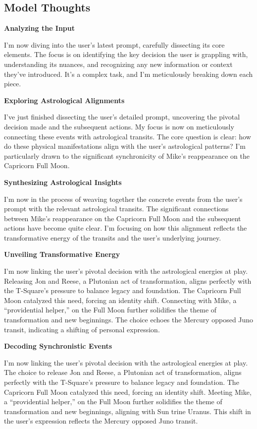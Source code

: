\documentclass{article}
\begin{document}
\medskip

\subsection*{Model Thoughts}\label{model-thoughts}

\textbf{Analyzing the Input}

I'm now diving into the user's latest prompt, carefully dissecting its
core elements. The focus is on identifying the key decision the user is
grappling with, understanding its nuances, and recognizing any new
information or context they've introduced. It's a complex task, and I'm
meticulously breaking down each piece.

\textbf{Exploring Astrological Alignments}

I've just finished dissecting the user's detailed prompt, uncovering the
pivotal decision made and the subsequent actions. My focus is now on
meticulously connecting these events with astrological transits. The
core question is clear: how do these physical manifestations align with
the user's astrological patterns? I'm particularly drawn to the
significant synchronicity of Mike's reappearance on the Capricorn Full
Moon.

\textbf{Synthesizing Astrological Insights}

I'm now in the process of weaving together the concrete events from the
user's prompt with the relevant astrological transits. The significant
connections between Mike's reappearance on the Capricorn Full Moon and
the subsequent actions have become quite clear. I'm focusing on how this
alignment reflects the transformative energy of the transits and the
user's underlying journey.

\textbf{Unveiling Transformative Energy}

I'm now linking the user's pivotal decision with the astrological
energies at play. Releasing Jon and Reese, a Plutonian act of
transformation, aligns perfectly with the T-Square's pressure to balance
legacy and foundation. The Capricorn Full Moon catalyzed this need,
forcing an identity shift. Connecting with Mike, a ``providential
helper,'' on the Full Moon further solidifies the theme of
transformation and new beginnings. The choice echoes the Mercury opposed
Juno transit, indicating a shifting of personal expression.

\textbf{Decoding Synchronistic Events}

I'm now linking the user's pivotal decision with the astrological
energies at play. The choice to release Jon and Reese, a Plutonian act
of transformation, aligns perfectly with the T-Square's pressure to
balance legacy and foundation. The Capricorn Full Moon catalyzed this
need, forcing an identity shift. Meeting Mike, a ``providential
helper,'' on the Full Moon further solidifies the theme of
transformation and new beginnings, aligning with Sun trine Uranus. This
shift in the user's expression reflects the Mercury opposed Juno
transit.
\end{document}
